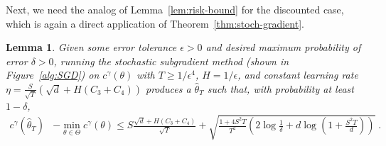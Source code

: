 \documentclass[11pt]{article}
\newtheorem{lemma}[theorem]{Lemma}
\begin{document}
Next, we need the analog of Lemma~\ref{lem:risk-bound} for the discounted case, which is again a direct application of Theorem~\ref{thm:stoch-gradient}.
\begin{lemma}
\label{lem:risk-bound-discounted}
  Given some error tolerance $\epsilon>0$ and desired maximum probability of error $\delta>0$, running the stochastic subgradient method (shown in Figure~\ref{alg:SGD}) on $c^\gamma(\theta)$ with $T\geq 1/\epsilon^4$, $H=1/\epsilon$, and constant learning rate $\eta=\frac{S}{\sqrt{T}}\left(\sqrt{d} + H (C_3 + C_4)\right)$
produces a $\widehat\theta_T$ such that, with probability at least $1-\delta$,
\begin{align}
\label{eqn:discounted_b_T}
c^\gamma(\widehat \theta_T) &-  \min_{\theta\in\Theta} c^\gamma(\theta) \le
S\frac{\sqrt{d} + H (C_3 + C_4)}{\sqrt{T}} + \sqrt{\frac{1 + 4 S^2 T}{T^2} \left(2 \log\frac{1}{\delta} + d \log \left( 1 + \frac{S^2 T}{d} \right) \right) } \; .
\end{align}
\end{lemma}
\end{document}
